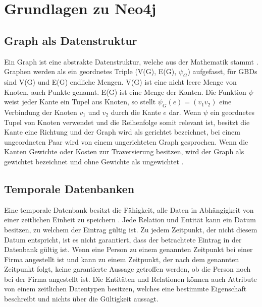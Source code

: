 

\chapter{Grundlagen zu Neo4j} %

\label{Kaptiel 2} %

\section{Graph als Datenstruktur}
Ein Graph ist eine abstrakte Datenstruktur, welche aus der Mathematik stammt \parencite{vicknair2010comparison}. Graphen werden als ein geordnetes Triple (V(G), E(G), $\psi_G$) aufgefasst, für GBDs sind V(G) und E(G) endliche Mengen. V(G) ist eine nicht leere Menge von Knoten, auch Punkte genannt. E(G) ist eine Menge der Kanten. Die Funktion $\psi$ weist jeder Kante ein Tupel aus Knoten, so stellt $\psi_G (e) = (v_1 v_2)$ eine Verbindung der Knoten $v_1$ und $v_2$ durch die Kante $e$ dar. Wenn $\psi$ ein geordnetes Tupel von Knoten verwendet und die Reihenfolge somit relevant ist, besitzt die Kante  eine  Richtung und der Graph wird als gerichtet bezeichnet, bei einem ungeordneten Paar wird von einem ungerichteten Graph gesprochen. Wenn die Kanten Gewichte oder Kosten zur Traversierung besitzen, wird der Graph als gewichtet bezeichnet und ohne Gewichte als ungewichtet \parencite{bondy1976graph}.

\section{Temporale Datenbanken}
Eine temporale Datenbank besitzt die Fähigkeit, alle Daten in Abhängigkeit von einer zeitlichen Einheit zu speichern \parencite{campos2016towards}. Jede Relation und Entität kann ein Datum besitzen, zu welchem der Eintrag gültig ist. Zu jedem  Zeitpunkt, der nicht diesem Datum entspricht, ist es nicht garantiert, dass der betrachtete Eintrag in der Datenbank gültig ist. Wenn eine Person zu einem genannten Zeitpunkt bei einer Firma angestellt ist und kann zu einem Zeitpunkt, der nach dem genannten Zeitpunkt folgt, keine garantierte Aussage getroffen werden, ob die Person noch bei der Firma angestellt ist. \newline
Die Entitäten und Relationen können auch Attribute von einem zeitlichen Datentypen besitzen, welches eine bestimmte Eigenschaft beschreibt und nichts über die Gültigkeit aussagt\parencite{khurana2012introduction}.  
